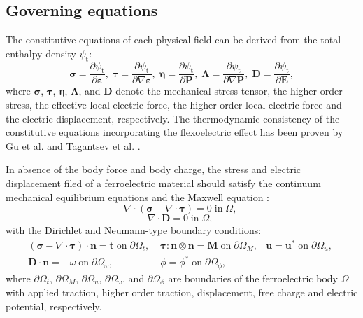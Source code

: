 \subsection{Governing equations}
The constitutive equations of each physical field can be derived from the total enthalpy density $\psi_\mathrm{t}$:
\begin{equation}
    \mathbf{\sigma}=\frac{\partial \psi_\mathrm{t}}{\partial\mathbf{\varepsilon}},\; 
    \mathbf{\tau}=\frac{\partial \psi_\mathrm{t}}{\partial \nabla\mathbf{\varepsilon}},\; 
    \mathbf{\eta}=\frac{\partial\psi_\mathrm{t}}{\partial \mathbf{P}},\;
    \mathbf{\Lambda}=\frac{\partial \psi_\mathrm{t}}{\partial \nabla\mathbf{P}},\;
    \mathbf{D}=\frac{\partial \psi_\mathrm{t}}{\partial \mathbf{E}},
\end{equation}
where $\mathbf{\sigma}$, $\mathbf{\tau}$, $\mathbf{\eta}$, $ \mathbf{\Lambda}$, and $\mathbf{D}$ denote the mechanical stress tensor, the higher order stress, the effective local electric force, the higher order local electric force and the electric displacement, respectively. The thermodynamic consistency of the constitutive equations incorporating the flexoelectric effect has been proven by Gu et al. \cite{gu_flexoelectricity_2014} and Tagantsev et al. \cite{tagantsev_flexoelectric_2012}.

In absence of the body force and body charge, the stress and electric displacement filed of a ferroelectric material should satisfy the continuum mechanical equilibrium equations and the Maxwell equation \cite{chang_liu_isogeometric_2019}:
\begin{equation}\label{equilibrium}
    \nabla\cdot\left( \mathbf{\sigma}-\nabla\cdot\mathbf{\tau} \right)=0\; \mathrm{in}\; \Omega,\;  
\end{equation}
\begin{equation}\label{Maxwell}
    \nabla \cdot \mathbf{D}=0 \; \mathrm{in}\; \Omega,\;
\end{equation}
with the Dirichlet and Neumann-type boundary conditions:
\begin{equation}
    \begin{split}
         (\mathbf{\sigma}-\nabla\cdot\mathbf{\tau})\cdot \mathbf{n}=\mathbf{t} \;\mathrm{on}\; \partial\Omega_t,\; 
        & \mathbf{\tau}:\mathbf{n}\otimes \mathbf{n} = \mathbf{M} \; \mathrm{on}\; \partial \Omega_M,
        &\mathbf{u}=\mathbf{u}^*\; \mathrm{on}\; \partial\Omega_u, \;\\
         \mathbf{D}\cdot \mathbf{n}=-\omega\;\mathrm{on}\; \partial\Omega_\omega,\;
        &\phi=\phi^* \;\mathrm{on}\; \partial\Omega_\phi,
    \end{split}
\end{equation}
where $\partial\Omega_t$, $\partial\Omega_M$, $\partial\Omega_u$, $\partial\Omega_\omega$, and $\partial\Omega_\phi$ are boundaries of the ferroelectric body $\Omega$ with applied traction, higher order traction, displacement, free charge and electric potential, respectively.

